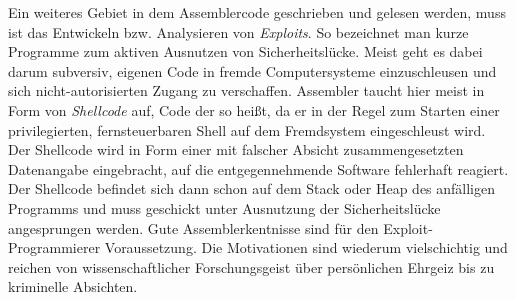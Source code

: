 Ein weiteres Gebiet in dem Assemblercode geschrieben und gelesen werden, muss ist das Entwickeln bzw. Analysieren von \emph{Exploits}. So bezeichnet man kurze Programme zum aktiven Ausnutzen von Sicherheitslücke. Meist geht es dabei darum subversiv, eigenen Code in fremde Computersysteme einzuschleusen und sich nicht-autorisierten Zugang zu verschaffen. Assembler taucht hier meist in Form von \emph{Shellcode} auf, Code der so heißt, da er in der Regel zum Starten einer privilegierten, fernsteuerbaren Shell auf dem Fremdsystem eingeschleust wird. Der Shellcode wird in Form einer mit falscher Absicht zusammengesetzten Datenangabe eingebracht, auf die entgegennehmende Software fehlerhaft reagiert. Der Shellcode befindet sich dann schon auf dem Stack oder Heap des anfälligen Programms und muss geschickt unter Ausnutzung der Sicherheitslücke angesprungen werden. Gute Assemblerkentnisse sind für den Exploit-Programmierer Voraussetzung. Die Motivationen sind wiederum vielschichtig und reichen von wissenschaftlicher Forschungsgeist über persönlichen Ehrgeiz bis zu kriminelle Absichten.
